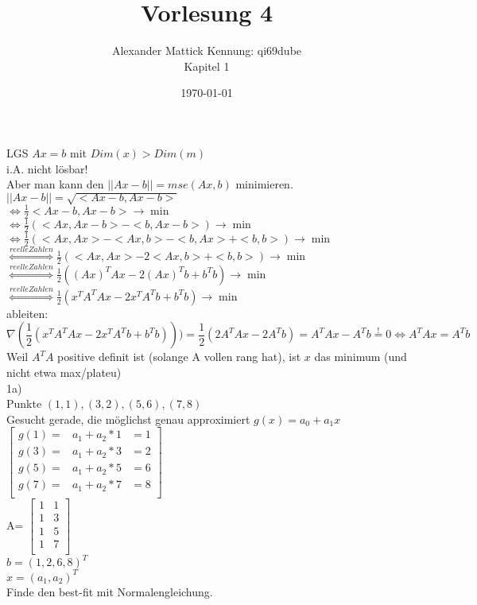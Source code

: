 \documentclass{article}
\author{
Alexander Mattick Kennung: qi69dube\\
Kapitel 1
}
\date{\today}
\title{Vorlesung 4}
\begin{document}
	\maketitle
	LGS $Ax=b$ mit  $Dim(x)>Dim(m)$\\
	i.A. nicht lösbar!\\
	Aber man kann den $||Ax-b|| =mse(Ax,b)$ minimieren.\\
	$||Ax-b|| = \sqrt{<Ax-b,Ax-b>}$\\
	$\iff \frac{1}{2} <Ax-b,Ax-b>\to \min$\\
	$\iff \frac{1}{2} (<Ax,Ax-b>-<b,Ax-b>)\to \min$\\
	$\iff \frac{1}{2} (<Ax,Ax>-<Ax,b>-<b,Ax>+<b,b>)\to \min$\\
	$\stackrel{reelle Zahlen}{\iff} \frac{1}{2} (<Ax,Ax>-2<Ax,b>+<b,b>)\to \min$\\
	$\stackrel{reelle Zahlen}{\iff} \frac{1}{2} ((Ax)^TAx-2(Ax)^Tb+b^Tb)\to \min$\\
	$\stackrel{reelle Zahlen}{\iff} \frac{1}{2} (x^TA^TAx-2x^TA^Tb+b^Tb)\to \min$\\
	ableiten:\\
	$$\nabla (\frac{1}{2} (x^TA^TAx-2x^TA^Tb+b^Tb)) ) = \frac{1}{2}(2A^TAx-2A^Tb) = A^TAx-A^Tb\stackrel{!}{=}0\iff A^TAx = A^Tb$$
	Weil $A^TA$ positive definit ist (solange A vollen rang hat), ist $x$ das minimum (und nicht etwa max/plateu)\\
	1a)\\
	Punkte $(1,1), (3,2), (5,6), (7,8)$\\
	Gesucht gerade, die möglichst genau approximiert $g(x) = a_0+a_1x$\\
	$\begin{bmatrix}
		g(1)=&a_1+a_2*1 &= 1\\
		g(3)=&a_1+a_2*3 &= 2\\
		g(5)=&a_1+a_2*5 &= 6\\
		g(7)=&a_1+a_2*7 &= 8\\
	\end{bmatrix}$\\
	A= $\begin{bmatrix}
		1&1\\
		1&3\\
		1&5\\
		1&7\\
	\end{bmatrix}$\\
	$b =(1,2,6,8)^T$\\
	$x = (a_1,a_2)^T$\\
	Finde den best-fit mit Normalengleichung.\\
\end{document}
